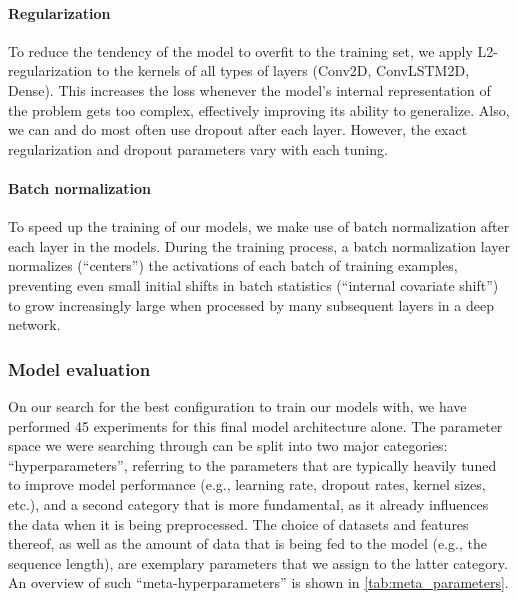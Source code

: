 \paragraph{Regularization} To reduce the tendency of the model to overfit to the training set, we apply L2-regularization to the kernels of all types of layers (Conv2D, ConvLSTM2D, Dense). This increases the loss whenever the model's internal representation of the problem gets too complex, effectively improving its ability to generalize. Also, we can and do most often use dropout after each layer. However, the exact regularization and dropout parameters vary with each tuning.

\paragraph{Batch normalization} To speed up the training of our models, we make use of batch normalization after each layer in the models. During the training process, a batch normalization layer normalizes (``centers'') the activations of each batch of training examples, preventing even small initial shifts in batch statistics (``internal covariate shift'') to grow increasingly large when processed by many subsequent layers in a deep network.

\subsubsection{Model evaluation}
On our search for the best configuration to train our models with, we have performed 45 experiments for this final model architecture alone. The parameter space we were searching through can be split into two major categories: ``hyperparameters'', referring to the parameters that are typically heavily tuned to improve model performance (e.g., learning rate, dropout rates, kernel sizes, etc.), and a second category that is more fundamental, as it already influences the data when it is being preprocessed. The choice of datasets and features thereof, as well as the amount of data that is being fed to the model (e.g., the sequence length), are exemplary parameters that we assign to the latter category. An overview of such ``meta-hyperparameters'' is shown in \cref{tab:meta_parameters}.

